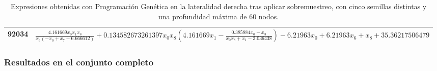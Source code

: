 \begin{table}[H]
{\begin{tabular}{|c|c|}
92034            & $\frac{4.161669 x_{0} x_{1} x_{8}}{x_{6} \left(- x_{0} + x_{7} + 6.666612\right)} + 0.134582673261397 x_{0} x_{8} \left(4.161669 x_{1} - \frac{0.385884 x_{0} - x_{3}}{x_{0} x_{8} + x_{1} - 3.036438}\right) - 6.21963 x_{0} + 6.21963 x_{6} + x_{8} + 35.36217506479$                                                                                                                           \\ \hline
\end{tabular}%
}
\caption{Expresiones obtenidas con Programación Genética en la lateralidad derecha tras aplicar sobremuestreo, con cinco semillas distintas y una profundidad máxima de 60 nodos.}\label{table:exp_PG_over_l1_60}

\end{table}



\subsubsection{Resultados en el conjunto completo}

\begin{table}[H]
\centering
{}
\caption{Resultados de Programación Genética en el conjunto de datos completo tras aplicar sobremuestreo, con cinco semillas distintas y una profundidad máxima de 20 nodos.}\label{table:resultados_PG_over_c_20}
\end{table}

